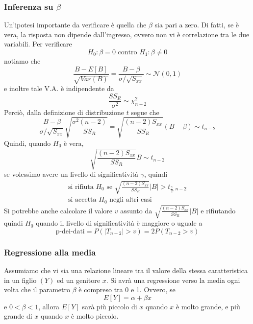 \documentclass[11pt]{article}
\begin{document}
\subsubsection{Inferenza su $\beta$}
Un'ipotesi importante da verificare è quella che $\beta$ sia pari a zero. Di fatti, se è vera, la risposta non dipende dall'ingresso, ovvero non vi è correlazione tra le due variabili. Per verificare
\begin{displaymath}
    H_0: \beta=0 \mbox{ contro }H_1:\beta\neq0
\end{displaymath}
notiamo che 
\begin{displaymath}
    \frac{B-E[B]}{\sqrt{Var(B)}}=\frac{B-\beta}{\sigma/\sqrt{S_{xx}}} \sim \mathcal{N}(0,1)
\end{displaymath}
e inoltre tale V.A. è indipendente da
\begin{displaymath}
    \frac{SS_R}{\sigma^2} \sim \chi^2_{n-2}
\end{displaymath}
Perciò, dalla definizione di distribuzione $t$ segue che 
\begin{displaymath}
    \frac{B-\beta}{\sigma/\sqrt{S_{xx}}}\sqrt{\frac{\sigma^2(n-2)}{SS_R}}=\sqrt{\frac{(n-2)S_{xx}}{SS_R}}(B-\beta)\sim t_{n-2}
\end{displaymath}
Quindi, quando $H_0$ è vera,
\begin{displaymath}
    \sqrt{\frac{(n-2)S_{xx}}{SS_R}}B\sim t_{n-2}
\end{displaymath}
se volessimo avere un livello di significatività $\gamma$, quindi
\begin{gather*}
    \mbox{si rifiuta }H_0\mbox{ se }\sqrt{\frac{(n-2)S_{xx}}{SS_R}}|B|> t_{\frac{\gamma}{2},n-2}\\ 
    \mbox{si accetta }H_0\mbox{ negli altri casi}
\end{gather*}
Si potrebbe anche calcolare il valore $v$ assunto da $\sqrt{\frac{(n-2)S_{xx}}{SS_R}}|B|$ e rifiutando quindi $H_0$ quando il livello di significatività è maggiore o uguale a 
\begin{displaymath}
    \mbox{p-dei-dati}=P(|T_{n-2}|>v)=2P(T_{n-2}>v)
\end{displaymath}
\subsubsection{Regressione alla media}
Assumiamo che vi sia una relazione lineare tra il valore della stessa caratteristica in un figlio $(Y)$ ed un genitore $x$. Si avrà una regressione verso la media ogni volta che il parametro $\beta$ è compreso tra 0 e 1. Ovvero, se 
\begin{displaymath}
    E[Y]=\alpha+\beta x
\end{displaymath}
e $0<\beta<1$, allora $E[Y]$ sarà più piccolo di $x$ quando $x$ è molto grande, e più grande di $x$ quando $x$ è molto piccolo. 
\end{document}

